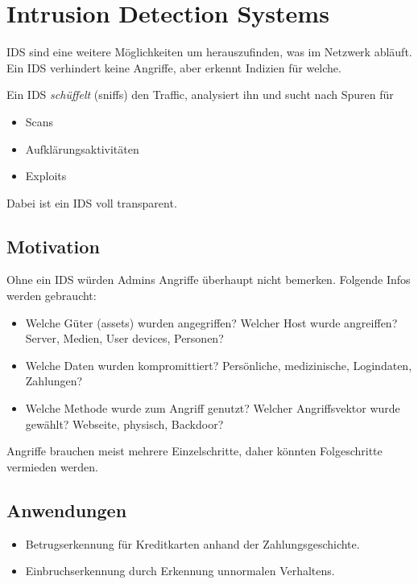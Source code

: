 \section{Intrusion Detection Systems}%
\label{sec:intrusion_detection_systems}

IDS sind eine weitere Möglichkeiten um herauszufinden, was im Netzwerk abläuft.
Ein IDS verhindert keine Angriffe, aber erkennt Indizien für welche.

Ein IDS \emph{schüffelt} (sniffs) den Traffic, analysiert ihn und sucht nach Spuren für
\begin{itemize}
  \item Scans
  \item Aufklärungsaktivitäten
  \item Exploits
\end{itemize}
Dabei ist ein IDS voll transparent.

\subsection{Motivation}%
\label{sub:motivation}

Ohne ein IDS würden Admins Angriffe überhaupt nicht bemerken.
Folgende Infos werden gebraucht:
\begin{itemize}
  \item Welche Güter (assets) wurden angegriffen?
    Welcher Host wurde angreiffen?
    Server, Medien, User devices, Personen?
  \item Welche Daten wurden kompromittiert?
    Persönliche, medizinische, Logindaten, Zahlungen?
  \item Welche Methode wurde zum Angriff genutzt?
    Welcher Angriffsvektor wurde gewählt?
    Webseite, physisch, Backdoor?
\end{itemize}
Angriffe brauchen meist mehrere Einzelschritte, daher könnten Folgeschritte vermieden
werden.

\subsection{Anwendungen}%
\label{sub:anwendungen}

\begin{itemize}
  \item Betrugserkennung für Kreditkarten anhand der Zahlungsgeschichte.
  \item Einbruchserkennung durch Erkennung unnormalen Verhaltens.
\end{itemize}

